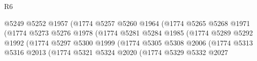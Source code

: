 \begin{lexlean}{R6}
\begin{coremodule}
                                              @5249
                                              @5252
                                              @1957
                                              (@1774
                                                @5257
                                                @5260
                                                @1964
                                                (@1774
                                                  @5265
                                                  @5268
                                                  @1971
                                                  (@1774
                                                    @5273
                                                    @5276
                                                    @1978
                                                    (@1774
                                                      @5281
                                                      @5284
                                                      @1985
                                                      (@1774
                                                        @5289
                                                        @5292
                                                        @1992
                                                        (@1774
                                                          @5297
                                                          @5300
                                                          @1999
                                                          (@1774
                                                            @5305
                                                            @5308
                                                            @2006
                                                            (@1774
                                                              @5313
                                                              @5316
                                                              @2013
                                                              (@1774
                                                                @5321
                                                                @5324
                                                                @2020
                                                                (@1774
                                                                  @5329
                                                                  @5332
                                                                  @2027

\end{coremodule}
\end{lexlean}

